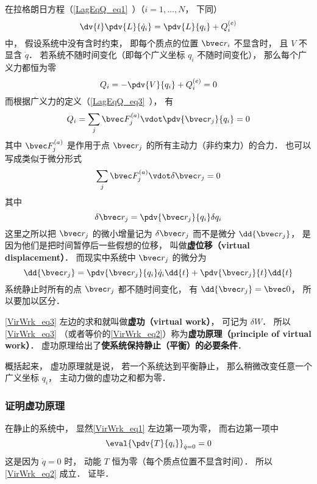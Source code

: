 
\begin{issues}
\issueTODO
\end{issues}


在拉格朗日方程（\autoref{LagEqQ_eq1}~）（$i=1,\dots,N$， 下同）
\begin{equation}\label{VirWrk_eq1}
\dv{t} \pdv{L}{\dot q_i} = \pdv{L}{q_i} + Q_i^{(e)}
\end{equation}
中， 假设系统中没有含时约束， 即每个质点的位置 $\bvec r_i$ 不显含时， 且 $V$ 不显含 $\dot q$． 若系统不随时间变化（即每个广义坐标 $q_i$ 不随时间变化）， 那么每个广义力都恒为零
\begin{equation}\label{VirWrk_eq2}
Q_i = -\pdv{V}{q_i} + Q_i^{(e)} = 0
\end{equation}
而根据广义力的定义（\autoref{LagEqQ_eq3}~）， 有
\begin{equation}
Q_i = \sum_j \bvec F_j^{(a)} \vdot \pdv{\bvec r_j}{q_i} = 0
\end{equation}
其中 $\bvec F_j^{(a)}$ 是作用于点 $\bvec r_j$ 的所有主动力（非约束力）的合力． 也可以写成类似于微分形式
\begin{equation}\label{VirWrk_eq3}
\sum_j \bvec F_j^{(a)} \vdot \delta \bvec r_j = 0
\end{equation}
其中
\begin{equation}
\delta \bvec r_j = \pdv{\bvec r_j}{q_i}\delta{q_i}
\end{equation}
这里之所以把 $\bvec r_j$ 的微小增量记为 $\delta \bvec r_j$ 而不是微分 $\dd{\bvec r_j}$， 是因为他们是把时间暂停后一些假想的位移， 叫做\textbf{虚位移（virtual displacement）}． 而现实中系统中 $\bvec r_j$ 的微分为
\begin{equation}
\dd{\bvec r_j} = \pdv{\bvec r_j}{q_i}\dot{q}_i\dd{t} + \pdv{\bvec r_j}{t}\dd{t}
\end{equation}
系统静止时所有的点 $\bvec r_j$ 都不随时间变化， 有 $\dd{\bvec r_j} = \bvec 0$， 所以要加以区分．

\autoref{VirWrk_eq3} 左边的求和就叫做\textbf{虚功（virtual work）}， 可记为 $\delta W$． 所以\autoref{VirWrk_eq3} （或者等价的\autoref{VirWrk_eq2}）称为\textbf{虚功原理（principle of virtual work）}． 虚功原理给出了\textbf{使系统保持静止（平衡）的必要条件}．

概括起来， 虚功原理就是说， 若一个系统达到平衡静止， 那么稍微改变任意一个广义坐标 $q_i$， 主动力做的虚功之和都为零．

\subsubsection{证明虚功原理}
在静止的系统中， 显然\autoref{VirWrk_eq1} 左边第一项为零， 而右边第一项中
\begin{equation}
\eval{\pdv{T}{q_i}}_{\dot q = 0} = 0
\end{equation}
这是因为 $\dot q = 0$ 时， 动能 $T$ 恒为零（每个质点位置不显含时间）． 所以\autoref{VirWrk_eq2} 成立． 证毕．

